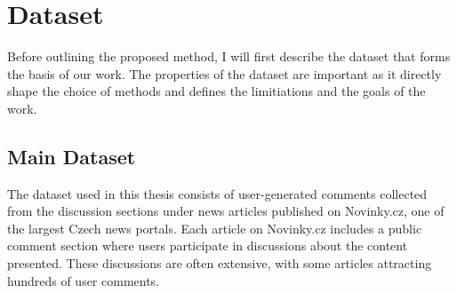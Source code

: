 \documentclass[twoside]{ctuthesis}
\theoremstyle{plain}
\theoremstyle{definition}
\theoremstyle{note}
\begin{document}



\chapter{Dataset}

Before outlining the proposed method, I will first describe the dataset that forms the basis of our work. The properties of the dataset are important as it directly shape the choice of methods and defines the limitiations and the goals of the work. \par

\section{Main Dataset}
The dataset used in this thesis consists of user-generated comments collected from the discussion sections under news articles published on Novinky.cz, one of the largest Czech news portals. Each article on Novinky.cz includes a public comment section where users participate in discussions about the content presented. These discussions are often extensive, with some articles attracting hundreds of user comments.\par
\end{document}
